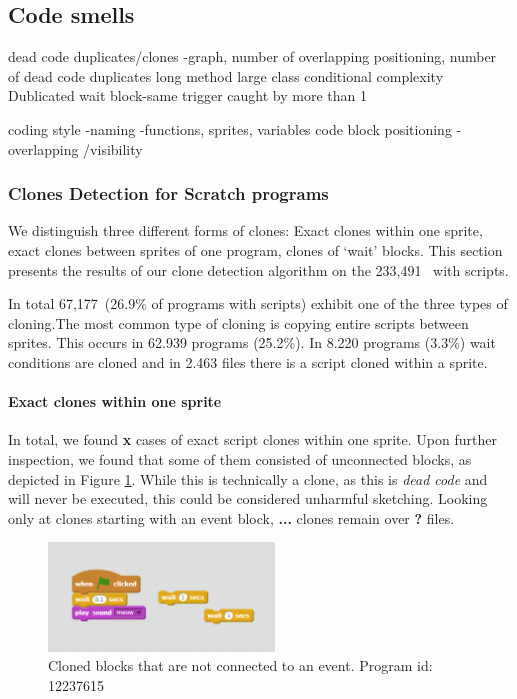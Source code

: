 \documentclass{sig-alternate}
\newcommand{\nScriptPrograms}{233,491}
\newcommand{\nProgramsWithClones}{67,177}
\newcommand{\todo}[1]{\textbf{#1}}
\begin{document}
\subsection{Code smells}
dead code
duplicates/clones -graph, number of overlapping positioning, number of dead code duplicates
long method
large class
conditional complexity
Dublicated wait block-same trigger caught by more than 1

coding style -naming -functions, sprites, variables
code block positioning - overlapping /visibility

\subsubsection{Clones Detection for Scratch programs}
\label{clone_Detection}

We distinguish three different forms of clones: Exact clones within one sprite, exact clones between sprites of one program, clones of `wait' blocks. This section presents the results of our clone detection algorithm on the \nScriptPrograms~ with scripts.

In total \nProgramsWithClones~(26.9\% of programs with scripts) exhibit one of the three types of cloning.The most common type of cloning is copying entire scripts between sprites. This occurs in 62.939 programs (25.2\%). In 8.220 programs (3.3\%) wait conditions are cloned and in 2.463 files there is a script cloned within a sprite.

\paragraph{Exact clones within one sprite}
In total, we found \todo{x} cases of exact script clones within one sprite. Upon further inspection, we found that some of them consisted of unconnected blocks, as depicted in Figure \ref{fig:Unconnected_clones}. While this is technically a clone, as this is \emph{dead code} and will never be executed, this could be considered unharmful sketching. Looking only at clones starting with an event block, \todo{...} clones remain over \todo{?} files.

\begin{figure}
	\begin{center}
		\includegraphics[width=6cm]{fig/Unconnected_clones.png}
		\caption{Cloned blocks that are not connected to an event. Program id: 12237615}
		\label{fig:Unconnected_clones}
	\end{center}
\end{figure} 
\end{document}
